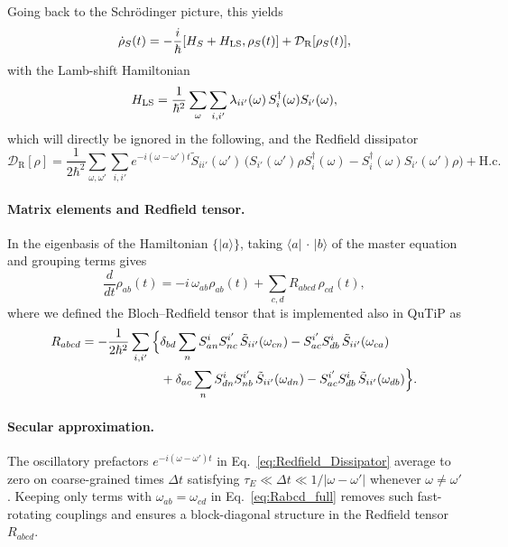 Going back to the Schrödinger picture, this yields
\begin{equation}
\dot{\rho}_S(t)=-\frac{i}{\hbar}[H_S+H_{\rm LS},\rho_S(t)]+\mathcal{D}_\mathrm{R}[\rho_S(t)],
\end{equation}
with the Lamb-shift Hamiltonian
\begin{equation}
	H_{\rm LS}=\frac{1}{\hbar^{2}}\sum_{\omega}\sum_{i, i'}\lambda_{ii'}(\omega)\,
	S_i^\dagger(\omega)S_{i'}(\omega),
	\label{eq:Lamb_Shift_Hamiltonian}
\end{equation}
which will directly be ignored in the following, and the Redfield dissipator
\begin{equation}
	\mathcal{D}_\mathrm{R}[\rho]
	=\frac{1}{2\hbar^{2}}\sum_{\omega,\omega'}\sum_{i, i'}
	e^{-i(\omega-\omega')t} \tilde{S}_{ii'}(\omega')\,
	\Big(
		S_{i'}(\omega')\rho S_i^\dagger(\omega)
		- S_i^\dagger(\omega)S_{i'}(\omega')\rho
	\Big) + \text{H.c.}
	\label{eq:Redfield_Dissipator}
\end{equation}


\paragraph{Matrix elements and Redfield tensor.}
In the eigenbasis of the Hamiltonian $\{|a\rangle\}$, taking $\langle a|\,\cdot\,|b\rangle$ of the master equation and grouping terms gives
\begin{equation}
\frac{d}{dt}\rho_{ab}(t)
= -i\,\omega_{ab}\rho_{ab}(t) + \sum_{c,d} R_{abcd}\,\rho_{cd}(t),
\label{eq:bloch_redfield_basis}
\end{equation}
where we defined the Bloch–Redfield tensor that is implemented also in QuTiP as
\begin{align}
R_{abcd}
= -\frac{1}{2\hbar^{2}} \sum_{i, i'}\Big\{&
\delta_{bd}\sum_n S^{i}_{an}S^{i'}_{nc}\,\tilde{S}_{ii'}(\omega_{cn})
- S^{i'}_{ac}S^{i}_{db}\,\tilde{S}_{ii'}(\omega_{ca})
\notag\\
&+\delta_{ac}\sum_n S^{i}_{dn}S^{i'}_{nb}\,\tilde{S}_{ii'}(\omega_{dn})
- S^{i'}_{ac}S^{i}_{db}\,\tilde{S}_{ii'}(\omega_{db})
\Big\}.
\label{eq:Rabcd_full}
\end{align}


\paragraph{Secular approximation.}

\noindent
The oscillatory prefactors $e^{-i(\omega - \omega') t}$ in Eq.~\eqref{eq:Redfield_Dissipator} average to zero on coarse-grained times $\Delta t$ satisfying $\tau_E \ll \Delta t \ll 1/|\omega - \omega'|$ whenever $\omega \neq \omega'$. 
Keeping only terms with $\omega_{ab}=\omega_{cd}$ in Eq.~\eqref{eq:Rabcd_full} removes such fast-rotating couplings and ensures a block-diagonal structure in the Redfield tensor $R_{abcd}$.

